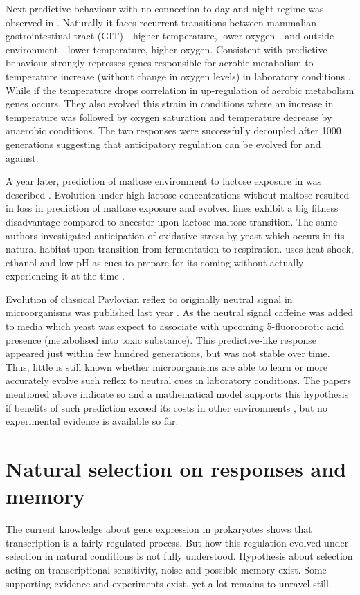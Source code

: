 Next predictive behaviour with no connection to day-and-night regime was observed in .
Naturally it faces recurrent transitions between mammalian gastrointestinal tract (GIT) - higher temperature, lower oxygen - and outside environment - lower temperature, higher oxygen.
Consistent with predictive behaviour  strongly represses genes responsible for aerobic metabolism to temperature increase (without change in oxygen levels) in laboratory conditions \cite{tagkopoulos2008predictive}.
While if the temperature drops correlation in up-regulation of aerobic metabolism genes occurs.
They also evolved this strain in conditions where an increase in temperature was followed by oxygen saturation and temperature decrease by anaerobic conditions.
The two responses were successfully decoupled after 1000 generations suggesting that anticipatory regulation can be evolved for and against.

A year later, prediction of maltose environment to lactose exposure in  was described \cite{mitchell2009adaptive}.
Evolution under high lactose concentrations without maltose resulted in loss in prediction of maltose exposure and evolved lines exhibit a big fitness disadvantage compared to ancestor upon lactose-maltose transition.
The same authors investigated anticipation of oxidative stress by yeast which occurs in its natural habitat upon transition from fermentation to respiration.
 uses heat-shock, ethanol and low pH as cues to prepare for its coming without actually experiencing it at the time \cite{mitchell2009adaptive}.

Evolution of classical Pavlovian reflex to originally neutral signal in microorganisms was published last year \cite{lopez2017adaptive}.
As the neutral signal caffeine was added to media which yeast  was expect to associate with upcoming 5-fluoroorotic acid presence (metabolised into toxic substance).
This predictive-like response appeared just within few hundred generations, but was not stable over time.
Thus, little is still known whether microorganisms are able to learn or more accurately evolve such reflex to neutral cues in laboratory conditions.
The papers mentioned above indicate so \cite{tagkopoulos2008predictive, mitchell2009adaptive} and a mathematical model supports this hypothesis if benefits of such prediction exceed its costs in other environments \cite{mitchell2011mathematical}, but no experimental evidence is available so far.


\section{Natural selection on responses and memory}
The current knowledge about gene expression in prokaryotes shows that transcription is a fairly regulated process.
But how this regulation evolved under selection in natural conditions is not fully understood.
Hypothesis about selection acting on transcriptional sensitivity, noise and possible memory exist.
Some supporting evidence and experiments exist, yet a lot remains to unravel still.

